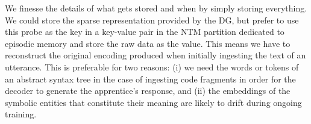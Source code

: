 We finesse the details of what gets stored and when by simply storing everything. We could store the sparse representation provided by the DG, but prefer to use this probe as the key in a key-value pair in the NTM partition dedicated to episodic memory and store the raw data as the value. This means we have to reconstruct the original encoding produced when initially ingesting the text of an utterance. This is preferable for two reasons: (i) we need the words \emdash{} or tokens of an abstract syntax tree in the case of ingesting code fragments \emdash{} in order for the decoder to generate the apprentice's response, and (ii) the embeddings of the symbolic entities that constitute their meaning are likely to drift during ongoing training.

